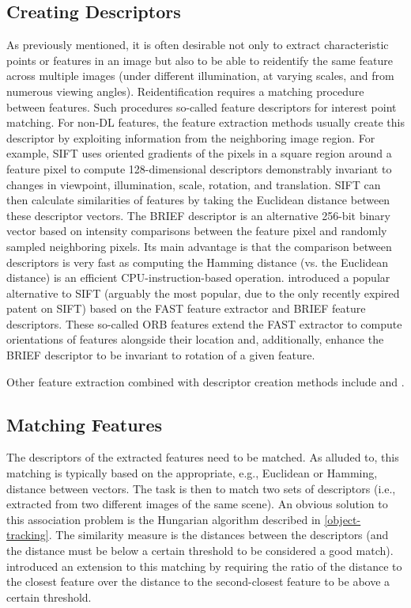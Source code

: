 \documentclass[headsepline, hidelinks, footsepline, footinclude=false, oneside, fontsize=11pt, paper=a4, listof=totoc, bibliography=totoc]{scrbook}
\begin{document}
\subsection{Creating Descriptors \label{creating-descriptors}}
\label{sec:org7fefdb1}
    As previously mentioned, it is often desirable not only to extract characteristic points or features in an image but also to be able to reidentify the same feature across multiple images 
(under different illumination, at varying scales, and from numerous viewing angles).
Reidentification requires a matching procedure between features. Such procedures so-called feature descriptors for interest point matching.
For non-DL features, the feature extraction methods usually create this descriptor by exploiting information from the neighboring image region.
For example, SIFT \cite{loweDistinctiveImageFeatures2004} uses oriented gradients of the pixels in a square region around a feature pixel to compute 128-dimensional descriptors demonstrably invariant to changes in viewpoint, illumination, scale, rotation, and translation. SIFT can then calculate similarities of features by taking the Euclidean distance between these descriptor vectors.
The BRIEF descriptor \cite{hutchisonBRIEFBinaryRobust2010} is an alternative 256-bit binary vector based on intensity comparisons between the feature pixel and randomly sampled neighboring pixels. Its main advantage is
that the comparison between descriptors is very fast as computing the Hamming distance (vs. the Euclidean distance) is an efficient CPU-instruction-based operation.
\cite{rubleeORBEfficientAlternative2011} introduced a popular alternative to SIFT (arguably the most popular, due to the only recently expired patent on SIFT) based on the FAST feature extractor and BRIEF feature descriptors.
These so-called ORB features extend the FAST extractor to compute orientations of features alongside their location and, additionally, enhance the BRIEF descriptor to be invariant to rotation of a given feature.

Other feature extraction combined with descriptor creation methods include \cite{baySURFSpeededRobust2006} and \cite{alcantarillaFastExplicitDiffusion2013}. 

\subsection{Matching Features \label{matching-features}}
\label{sec:orga218255}
    The descriptors of the extracted features need to be matched. As alluded to, this matching is typically based on the appropriate, e.g., Euclidean or Hamming, distance between vectors.
The task is then to match two sets of descriptors (i.e., extracted from two different images of the same scene). An obvious solution to this association problem is the Hungarian algorithm
described in \cref{object-tracking}. The similarity measure is the distances between the descriptors (and the distance must be below a certain threshold to be considered a good match). 
\cite{loweDistinctiveImageFeatures2004} introduced an extension to this matching by requiring the ratio of the distance to the closest feature over the distance to the second-closest feature to be above a certain threshold.
\end{document}
